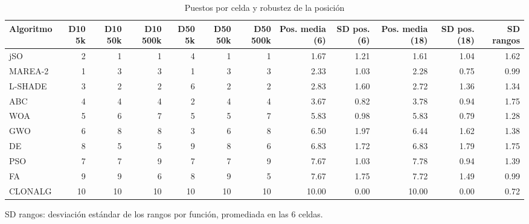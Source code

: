 \begin{table}[ht]\centering\small
\caption{Puestos por celda y robustez de la posición}
\begin{tabular}{lrrrrrrrrrrr}
\toprule
Algoritmo & D10 5k & D10 50k & D10 500k & D50 5k & D50 50k & D50 500k & Pos. media (6) & SD pos. (6) & Pos. media (18) & SD pos. (18) & SD rangos \\
\midrule
jSO & 2 & 1 & 1 & 4 & 1 & 1 & 1.67 & 1.21 & 1.61 & 1.04 & 1.62 \\
MAREA-2 & 1 & 3 & 3 & 1 & 3 & 3 & 2.33 & 1.03 & 2.28 & 0.75 & 0.99 \\
L-SHADE & 3 & 2 & 2 & 6 & 2 & 2 & 2.83 & 1.60 & 2.72 & 1.36 & 1.34 \\
ABC & 4 & 4 & 4 & 2 & 4 & 4 & 3.67 & 0.82 & 3.78 & 0.94 & 1.75 \\
WOA & 5 & 6 & 7 & 5 & 5 & 7 & 5.83 & 0.98 & 5.83 & 0.79 & 1.28 \\
GWO & 6 & 8 & 8 & 3 & 6 & 8 & 6.50 & 1.97 & 6.44 & 1.62 & 1.38 \\
DE & 8 & 5 & 5 & 9 & 8 & 6 & 6.83 & 1.72 & 6.83 & 1.79 & 1.75 \\
PSO & 7 & 7 & 9 & 7 & 7 & 9 & 7.67 & 1.03 & 7.78 & 0.94 & 1.39 \\
FA & 9 & 9 & 6 & 8 & 9 & 5 & 7.67 & 1.75 & 7.72 & 1.49 & 0.99 \\
CLONALG & 10 & 10 & 10 & 10 & 10 & 10 & 10.00 & 0.00 & 10.00 & 0.00 & 0.72 \\
\bottomrule
\end{tabular}
\par\footnotesize SD rangos: desviación estándar de los rangos por función, promediada en las 6 celdas.
\end{table}
